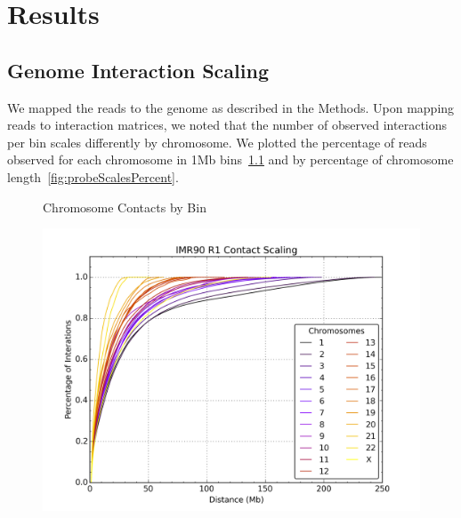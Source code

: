 \chapter{Results}

\section*{Genome Interaction Scaling}
We mapped the reads to the genome as described in the Methods.  Upon mapping reads to interaction matrices, we noted that the number
of observed interactions per bin scales differently by chromosome.  We plotted the percentage of reads observed for each chromosome
in 1Mb bins~\ref{fig:probeScalesMb} and by percentage of chromosome length~\ref{fig:probeScalesPercent}.

\begin{figure}[thp]
  \caption{Chromosome Contacts by Bin}
  \begin{minipage}{0.45\textwidth}%
    \centering
    \caption{}\label{fig:probeScalesMb}
    \includegraphics[width=\textwidth]{./figures/results/probeScalesMb.png}
  \end{minipage}


\end{figure}
